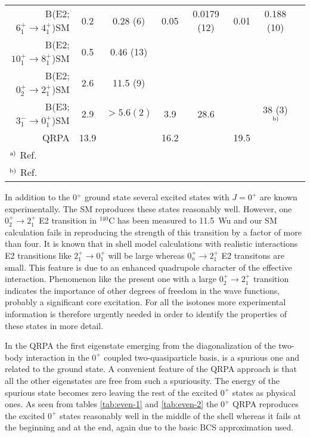 \begin{table}[htbp]
\begin{center}
\begin{tabular}{rccccccc}
B(E2;$6^{+}_{1} \rightarrow 4^{+}_{1}$)\hspace{1.cm}SM & 0.2  & 0.28 (6) & 0.05 & 
                           0.0179 (12) & 0.01 & 0.188 (10) \\
B(E2;$10^{+}_{1} \rightarrow 8^{+}_{1}$)\hspace{.85cm}SM & 0.5 & 0.46 (13) & & & & \\
B(E2;$0^{+}_{2} \rightarrow 2^{+}_{1}$)\hspace{1.cm}SM & 2.6  & 11.5 (9) & & & & \\
B(E3;$3^{-}_{1} \rightarrow 0^{+}_{1}$)\hspace{1.cm}SM & 2.9 & $> 5.6 (2)$ & 3.9 & 28.6 &
                             & 38 (3)$^{\,{\rm b})}$ \\
                            QRPA & 13.9 & & 16.2 & & 19.5 & \\  
\hline
\multicolumn{1}{l}{$^{{\rm a)}}$ {Ref.\ \cite{gvb90}}} & & & & & \\
\multicolumn{1}{l}{$^{{\rm b)}}$ {Ref.\ \cite{bbd89}}} & & & & & \\
\end{tabular}
\label{tab:even-e2-1}
\end{center}
\end{table}

In addition to the 0$^{+}$ ground state several excited states with 
$J = 0^{+}$ are known experimentally. The SM reproduces these states 
reasonably well. However, one $0^{+}_{2}\rightarrow 2^{+}_{1}$  E2 
transition in $^{140}$C  has been measured 
to 11.5~Wu and our  SM calculation fails in reproducing the strength of this
transition by a factor of more than four.
It is known that in shell model calculations with realistic interactions
E2 transitions like 
$2^{+}_{1} \rightarrow 0^{+}_{1}$ will be large whereas  
$0^{+}_{n} \rightarrow 2^{+}_{1}$ E2 transitons are small. This feature is 
due to an  enhanced quadrupole character of the effective interaction. Phenomenon like the present
one with a large $0^{+}_{2} \rightarrow 2^{+}_{1}$ transition indicates
the importance of other degrees of freedom in the wave functions, probably a significant
core excitation. For all the isotones more experimental information is therefore urgently
needed in order to identify the properties of these states in more detail. 

In the QRPA the first eigenstate
emerging from the diagonalization of the two-body interaction in
the $0^+$ coupled two-quasiparticle basis, is a spurious one \cite{bar60} and
related to the ground state. A convenient feature of the QRPA approach is that 
all the other eigenstates are free from such a spuriousity. 
The energy of the spurious state becomes zero leaving the rest of the 
excited $0^+$ states as physical ones. As seen from tables
\ref{tab:even-1} and \ref{tab:even-2} the $0^+$ 
QRPA reproduces the excited $0^{+}$ states  reasonably well in the middle of the shell
whereas it fails at the beginning and at the end, again due to the basic
BCS approximation used.

